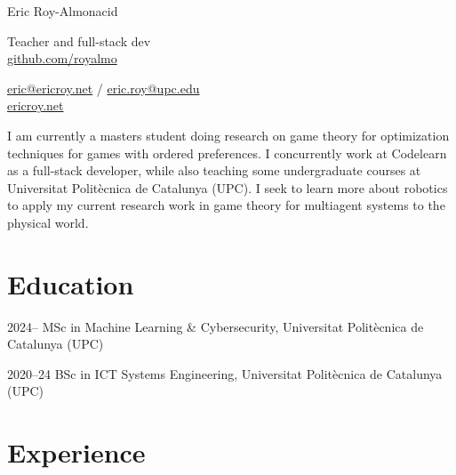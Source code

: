 \documentclass[a4paper]{report}
\newcommand{\namefont}[1]{{\Huge{#1}}}
\begin{document}
    \raggedright{}

    \namefont{Eric Roy-Almonacid}

    \vspace{1.7em}
    \begin{minipage}[t]{0.595\textwidth}
        Teacher and full-stack dev\\
        \href{https://github.com/royalmo}{github.com/royalmo}%
    \end{minipage}
    \begin{minipage}[t]{0.395\textwidth}
        \flushright{}
        \href{mailto:eric@ericroy.net}{eric@ericroy.net} / \href{mailto:eric.roy@upc.edu}{eric.roy@upc.edu} \\
        \href{https://ericroy.net}{ericroy.net}
    \end{minipage}

    \vspace{1.7em}
    
I am currently a masters student doing research on game theory for optimization techniques for games with ordered preferences. 
I concurrently work at Codelearn as a full-stack developer, while also teaching some undergraduate courses at Universitat Politècnica de Catalunya (UPC).
I seek to learn more about robotics to apply my current research work in game theory for multiagent systems to the physical world.

\vspace{-1em}
\section*{Education}

\begin{tablist}
\item[2024--] \tab{}MSc in Machine Learning \& Cybersecurity, Universitat Politècnica de Catalunya (UPC)
\item[2020--24] \tab{}BSc in ICT Systems Engineering, Universitat Politècnica de Catalunya (UPC)
\end{tablist}

\vspace{-1em}
\section*{Experience}
\end{document}
